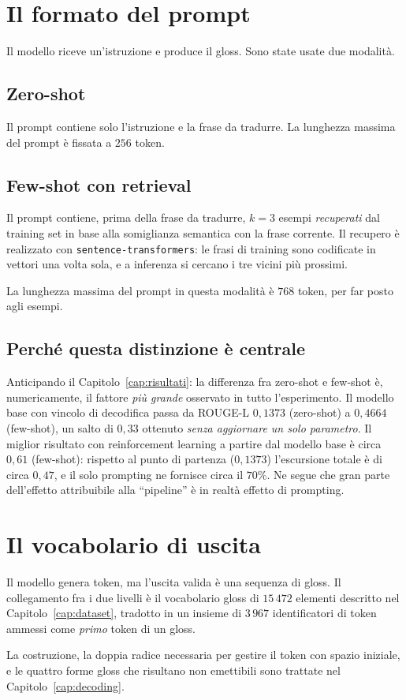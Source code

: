 \section{Il formato del prompt}

Il modello riceve un'istruzione e produce il gloss. Sono state usate due
modalità.

\subsection{Zero-shot}

Il prompt contiene solo l'istruzione e la frase da tradurre. La lunghezza
massima del prompt è fissata a $256$ token.

\subsection{Few-shot con retrieval}

Il prompt contiene, prima della frase da tradurre, $k=3$ esempi
\emph{recuperati} dal training set in base alla somiglianza semantica con la
frase corrente. Il recupero è realizzato con \texttt{sentence-transformers}: le
frasi di training sono codificate in vettori una volta sola, e a inferenza si
cercano i tre vicini più prossimi.

La lunghezza massima del prompt in questa modalità è $768$ token, per far posto
agli esempi.

\subsection{Perché questa distinzione è centrale}

Anticipando il Capitolo~\ref{cap:risultati}: la differenza fra zero-shot e
few-shot è, numericamente, il fattore \emph{più grande} osservato in tutto
l'esperimento. Il modello base con vincolo di decodifica passa da ROUGE-L
$0{,}1373$ (zero-shot) a $0{,}4664$ (few-shot), un salto di $0{,}33$ ottenuto
\emph{senza aggiornare un solo parametro}. Il miglior risultato con
reinforcement learning a partire dal modello base è circa $0{,}61$ (few-shot):
rispetto al punto di partenza ($0{,}1373$) l'escursione totale è di circa
$0{,}47$, e il solo prompting ne fornisce circa il $70\%$. Ne segue che gran
parte dell'effetto attribuibile alla ``pipeline'' è in realtà effetto di
prompting.

\section{Il vocabolario di uscita}

Il modello genera token, ma l'uscita valida è una sequenza di gloss. Il
collegamento fra i due livelli è il vocabolario gloss di $15\,472$ elementi
descritto nel Capitolo~\ref{cap:dataset}, tradotto in un insieme di $3\,967$
identificatori di token ammessi come \emph{primo} token di un gloss.

La costruzione, la doppia radice necessaria per gestire il token con spazio
iniziale, e le quattro forme gloss che risultano non emettibili sono trattate
nel Capitolo~\ref{cap:decoding}.
